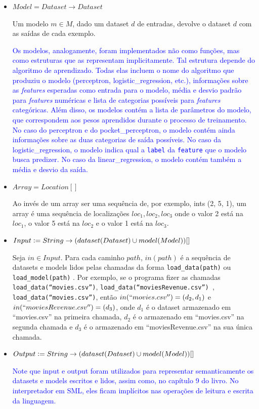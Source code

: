 \documentclass[12pt]{article}
\newcommand{\blu}{\textcolor{blue}}
\newcommand{\defeq}{\vcentcolon=}
\begin{document}
\begin{itemize}
\item $Model = Dataset \rightarrow Dataset$

Um modelo $m\in M$, dado um dataset $d$ de entradas, devolve o dataset $d$ com as saídas de cada exemplo.

\blu{Os modelos, analogamente, foram implementados não como funções, mas como estruturas que as representam implicitamente. Tal estrutura depende do algoritmo de aprendizado. Todas elas incluem o nome do algoritmo que produziu o modelo (perceptron, logistic\_regression, etc.), informações sobre as \textit{features} esperadas como entrada para o modelo, média e desvio padrão para \textit{features} numéricas e lista de categorias possíveis para \textit{features} categóricas. Além disso, os modelos contém a lista de parâmetros do modelo, que correspondem aos pesos aprendidos durante o processo de treinamento. No caso do perceptron e do pocket\_perceptron, o modelo contém ainda informações sobre as duas categorias de saída possíveis. No caso da  logistic\_regression, o modelo indica qual a \texttt{label} da \texttt{feature} que o modelo busca predizer. No caso da linear\_regression, o modelo contém também a média e desvio da saída.}


\item $Array = Location[]$

Ao invés de um array ser uma sequência de, por exemplo, ints (2, 5, 1), um array é uma sequência de localizações $loc_1,loc_2,loc_3$ onde o valor 2 está na $loc_1$, o valor 5 está na $loc_2$ e o valor 1 está na $loc_3$.

\item $Input \defeq String\rightarrow (dataset(Dataset)\cup model(Model))[]$

Seja $in\in Input$. Para cada caminho $path$, $in(path)$ é  a sequência de datasets e models lidos pelas chamadas da forma {\tt load\_data(path)} ou {\tt load\_model(path)} . Por exemplo, se o programa fizer as chamadas {\tt load\_data(``movies.csv'')}, {\tt load\_data(``moviesRevenue.csv'') }, {\tt load\_data(``movies.csv'')}, então $in(``movies.csv'') = (d_2, d_1)$ e $in(``moviesRevenue.csv'') = (d_3)$, onde $d_1$ é o dataset armazenado em ``movies.csv'' na primeira chamada, $d_2$ é o armazenado em ``movies.csv'' na segunda chamada e $d_3$ é o armazenado em ``moviesRevenue.csv'' na sua única chamada.


\item $Output \defeq String\rightarrow (dataset(Dataset)\cup model(Model))[]$

\blu{Note que input e output foram utilizados para representar semanticamente os datasets e models escritos e lidos, assim como, no capítulo 9 do livro\cite{Chap9}. No interpretador em SML, eles ficam implícitos nas operações de leitura e escrita da linguagem.} 


\end{itemize}
\end{document}
